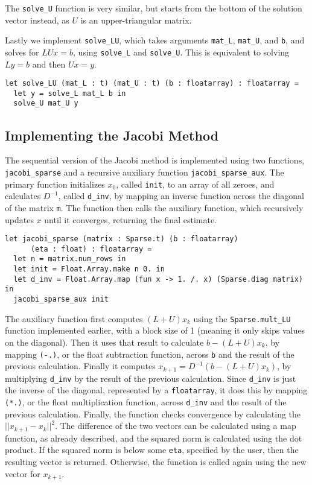 \documentclass[pageno]{jpaper}
\begin{document}
\begin{doublespacing}
The \verb|solve_U| function is very similar, but starts from the bottom of the solution vector instead, as $U$ is an upper-triangular matrix.

Lastly we implement \verb|solve_LU|, which takes arguments \verb|mat_L|, \verb|mat_U|, and \verb|b|, and solves for $LUx = b$, using \verb|solve_L| and \verb|solve_U|. This is equivalent to solving $Ly = b$ and then $Ux = y$.

\begin{verbatim}
let solve_LU (mat_L : t) (mat_U : t) (b : floatarray) : floatarray = 
  let y = solve_L mat_L b in
  solve_U mat_U y
\end{verbatim}

\subsection{Implementing the Jacobi Method}
The sequential version of the Jacobi method is implemented using two functions, \verb|jacobi_sparse| and a recursive auxiliary function \verb|jacobi_sparse_aux|. The primary function initializes $x_0$, called \verb|init|, to an array of all zeroes, and calculates $D^{-1}$, called \verb|d_inv|, by mapping an inverse function across the diagonal of the matrix \verb|m|. The function then calls the auxiliary function, which recursively updates $x$ until it converges, returning the final estimate.

\begin{verbatim}
let jacobi_sparse (matrix : Sparse.t) (b : floatarray)
      (eta : float) : floatarray =
  let n = matrix.num_rows in
  let init = Float.Array.make n 0. in
  let d_inv = Float.Array.map (fun x -> 1. /. x) (Sparse.diag matrix) in
  jacobi_sparse_aux init
\end{verbatim}

The auxiliary function first computes $(L + U)x_k$ using the \verb|Sparse.mult_LU| function implemented earlier, with a block size of 1 (meaning it only skips values on the diagonal). Then it uses that result to calculate $b - (L + U)x_k$, by mapping \verb|(-.)|, or the float subtraction function, across \verb|b| and the result of the previous calculation. Finally it computes $x_{k+1} = D^{-1} (b - (L + U) x_k)$, by multiplying \verb|d_inv| by the result of the previous calculation. Since \verb|d_inv| is just the inverse of the diagonal, represented by a \verb|floatarray|, it does this by mapping \verb|(*.)|, or the float multiplication function, across \verb|d_inv| and the result of the previous calculation. Finally, the function checks convergence by calculating the $||x_{k + 1} - x_k||^2$. The difference of the two vectors can be calculated using a map function, as already described, and the squared norm is calculated using the dot product. If the squared norm is below some \verb|eta|, specified by the user, then the resulting vector is returned. Otherwise, the function is called again using the new vector for $x_{k+1}$.


\end{doublespacing}
\end{document}
